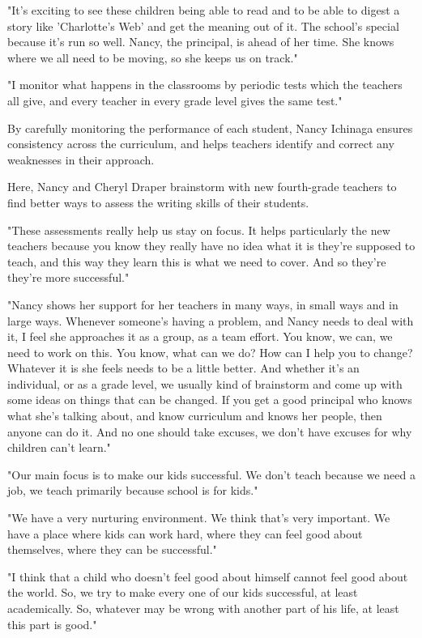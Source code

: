 "It's exciting to see these children being able to read and to be able to digest a story like 'Charlotte's Web' and get the meaning out of it. The school's special because it's run so well. Nancy, the principal, is ahead of her time. She knows where we all need to be moving, so she keeps us on track."

"I monitor what happens in the classrooms by periodic tests which the teachers all give, and every teacher in every grade level gives the same test."

By carefully monitoring the performance of each student, Nancy Ichinaga ensures consistency across the curriculum, and helps teachers identify and correct any weaknesses in their approach.

Here, Nancy and Cheryl Draper brainstorm with new fourth-grade teachers to find better ways to assess the writing skills of their students.

"These assessments really help us stay on focus. It helps particularly the new teachers because you know they really have no idea what it is they're supposed to teach, and this way they learn this is what we need to cover. And so they're they're more successful."

"Nancy shows her support for her teachers in many ways, in small ways and in large ways. Whenever someone's having a problem, and Nancy needs to deal with it, I feel she approaches it as a group, as a team effort. You know, we can, we need to work on this. You know, what can we do? How can I help you to change? Whatever it is she feels needs to be a little better. And whether it's an individual, or as a grade level, we usually kind of brainstorm and come up with some ideas on things that can be changed. If you get a good principal who knows what she's talking about, and know curriculum and knows her people, then anyone can do it. And no one should take excuses, we don't have excuses for why children can't learn."

"Our main focus is to make our kids successful. We don't teach because we need a job, we teach primarily because school is for kids."

"We have a very nurturing environment. We think that's very important. We have a place where kids can work hard, where they can feel good about themselves, where they can be successful."

"I think that a child who doesn't feel good about himself cannot feel good about the world. So, we try to make every one of our kids successful, at least academically. So, whatever may be wrong with another part of his life, at least this part is good."

